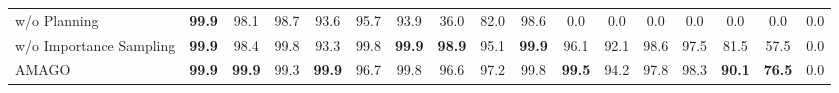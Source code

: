 \documentclass{article}
\begin{document}
\begin{table}[ht]
{\begin{tabular}{@{}lcccccccccccccccc@{}}
w/o Planning         & \textbf{99.9}                                           & 98.1                                                     & 98.7                                                   & 93.6                                               & 95.7                                                   & 93.9                                                  & 36.0                                               & 82.0                                                     & 98.6                                                    & 0.0                                                      & 0.0                                                      & 0.0                                                      & 0.0                                                    & 0.0                                                     & 0.0                                                        & 0.0                                                              \\
w/o Importance Sampling       & \textbf{99.9}                                           & 98.4                                                     & 99.8                                                   & 93.3                                               & 99.8                                                   & \textbf{99.9}                                         & \textbf{98.9}                                      & 95.1                                                     & \textbf{99.9}                                           & 96.1                                                     & 92.1                                                     & 98.6                                                     & 97.5                                                   & 81.5                                                    & 57.5                                                       & 0.0                                                              \\ \midrule
AMAGO                & \textbf{99.9}                                           & \textbf{99.9}                                            & 99.3                                                   & \textbf{99.9}                                      & 96.7                                                   & 99.8                                                  & 96.6                                               & 97.2                                                     & 99.8                                                    & \textbf{99.5}                                            & 94.2                                                     & 97.8                                                     & 98.3                                                   & \textbf{90.1}                                                    & \textbf{76.5}                                              & 0.0                                                              \\

\end{tabular}}
\end{table}
\end{document}
